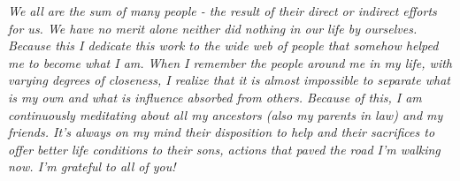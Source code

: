 \begin{dedicatoria}
   \vspace*{\fill}
   \centering
   \noindent
   \textit{We all are the sum of many people - the result of their direct or indirect  efforts for us. We have no merit alone neither did nothing in our life by ourselves. Because this I dedicate this work to the wide web of people that somehow helped me to become what I am. When I remember the people around me in my life, with varying degrees of closeness, I realize that it is almost impossible to separate what is my own and what is influence absorbed from others. Because of this, I am continuously meditating about all my ancestors (also my parents in law) and my friends. It's always on my mind their disposition to help and their sacrifices to offer better life conditions to their sons, actions that paved the road I'm walking now. I'm grateful to all of you!} 
   \vspace*{\fill}
\end{dedicatoria}